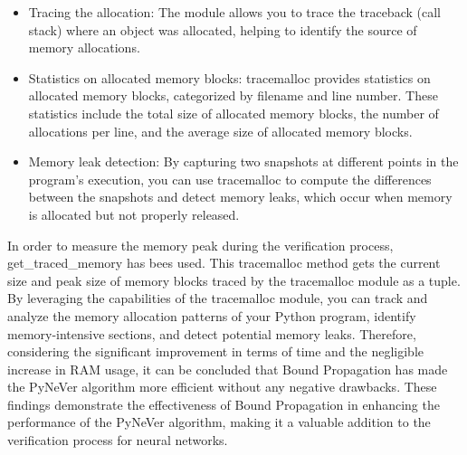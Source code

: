 \begin{itemize}
\item Tracing the allocation: The module allows you to trace the traceback (call stack) where an object was allocated, helping to identify the source of memory allocations.
\item Statistics on allocated memory blocks: tracemalloc provides statistics on allocated memory blocks, categorized by filename and line number. These statistics include the total size of allocated memory blocks, the number of allocations per line, and the average size of allocated memory blocks.
\item Memory leak detection: By capturing two snapshots at different points in the program's execution, you can use tracemalloc to compute the differences between the snapshots and detect memory leaks, which occur when memory is allocated but not properly released.
\end{itemize}
In order to measure the memory peak during the verification process, get\_traced\_memory has bees used. This tracemalloc method gets the current size and peak size of memory blocks traced by the tracemalloc module as a tuple.\\

By leveraging the capabilities of the tracemalloc module, you can track and analyze the memory allocation patterns of your Python program, identify memory-intensive sections, and detect potential memory leaks.
Therefore, considering the significant improvement in terms of time and the negligible increase in RAM usage, it can be concluded that Bound Propagation has made the PyNeVer algorithm more efficient without any negative drawbacks.
These findings demonstrate the effectiveness of Bound Propagation in enhancing the performance of the PyNeVer algorithm, making it a valuable addition to the verification process for neural networks.

